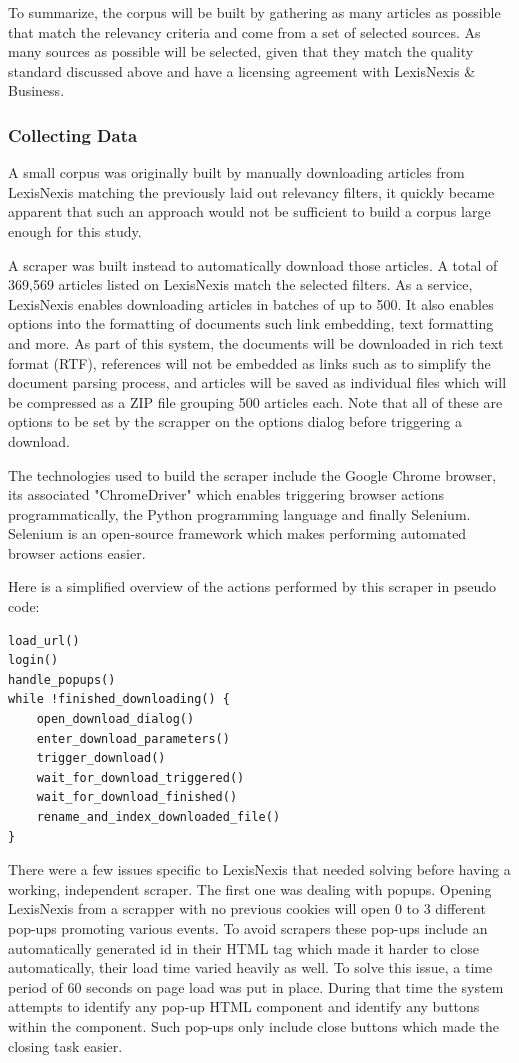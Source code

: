 To summarize, the corpus will be built by gathering as many articles as possible that match the relevancy criteria and come from a set of selected sources. As many sources as possible will be selected, given that they match the quality standard discussed above and have a licensing agreement with LexisNexis \& Business.

\subsubsection{Collecting Data}\label{Collecting Data}

A small corpus was originally built by manually downloading articles from LexisNexis matching the previously laid out relevancy filters, it quickly became apparent that such an approach would not be sufficient to build a corpus large enough for this study.

A scraper was built instead to automatically download those articles. A total of 369,569 articles listed on LexisNexis match the selected filters. As a service, LexisNexis enables downloading articles in batches of up to 500. It also enables options into the formatting of documents such link embedding, text formatting and more. As part of this system, the documents will be downloaded in rich text format (RTF), references will not be embedded as links such as to simplify the document parsing process, and articles will be saved as individual files which will be compressed as a ZIP file grouping 500 articles each. Note that all of these are options to be set by the scrapper on the options dialog before triggering a download.

The technologies used to build the scraper include the Google Chrome browser, its associated "ChromeDriver" which enables triggering browser actions programmatically, the Python programming language and finally Selenium. Selenium is an open-source framework which makes performing automated browser actions easier.

Here is a simplified overview of the actions performed by this scraper in pseudo code:

\begin{verbatim}
load_url()
login()
handle_popups()
while !finished_downloading() {
    open_download_dialog()
    enter_download_parameters()
    trigger_download()
    wait_for_download_triggered()
    wait_for_download_finished()
    rename_and_index_downloaded_file()
}
\end{verbatim}

There were a few issues specific to LexisNexis that needed solving before having a working, independent scraper. The first one was dealing with popups. Opening LexisNexis from a scrapper with no previous cookies will open 0 to 3 different pop-ups promoting various events. To avoid scrapers these pop-ups include an automatically generated id in their HTML tag which made it harder to close automatically, their load time varied heavily as well. To solve this issue, a time period of 60 seconds on page load was put in place. During that time the system attempts to identify any pop-up HTML component and identify any buttons within the component. Such pop-ups only include close buttons which made the closing task easier.


